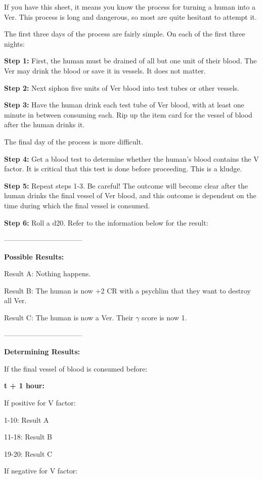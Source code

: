 \documentclass[green]{guildcamp4}
\begin{document}
\name{\gTurning{}}

If you have this sheet, it means you know the process for turning a human into a Ver. This process is long and dangerous, so most are quite hesitant to attempt it.

The first three days of the process are fairly simple. On each of the first three nights:

{\bf Step 1:} First, the human must be drained of all but one unit of their blood. The Ver may drink the blood or save it in vessels. It does not matter. 

{\bf Step 2:} Next siphon five units of Ver blood into test tubes or other vessels.

{\bf Step 3:} Have the human drink each test tube of Ver blood, with at least one minute in between consuming each. Rip up the item card for the vessel of blood after the human drinks it.

The final day of the process is more difficult.

{\bf Step 4:} Get a blood test to determine whether the human's blood contains the V factor. It is critical that this test is done before proceeding. This is a kludge.

{\bf Step 5:} Repeat steps 1-3. Be careful! The outcome will become clear after the human drinks the final vessel of Ver blood, and this outcome is dependent on the time during which the final vessel is consumed.

{\bf Step 6:} Roll a d20. Refer to the information below for the result:

---------------------------------

{\bf Possible Results:}

Result A: Nothing happens.

Result B: The human is now +2 CR with a psychlim that they want to destroy all Ver.

Result C: The human is now a Ver. Their $\gamma$ score is now 1.

---------------------------------

{\bf Determining Results:}

If the final vessel of blood is consumed before:

{\bf t + 1 hour:}

If positive for V factor:

1-10: Result A

11-18: Result B

19-20: Result C

If negative for V factor:
\end{document}
